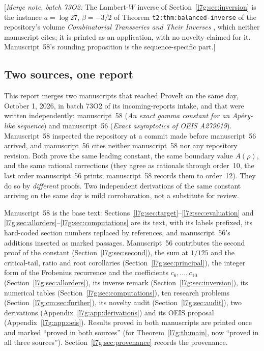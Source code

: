 \documentclass[11pt,letterpaper]{article}
\theoremstyle{remark}\newtheorem{remark}[theorem]{Remark}
\newcommand{\mergenote}[1]{\textup{[}\emph{Merge note, batch 73O2:} #1\textup{]}}
\newcounter{l7gtrsavedeq}
\begin{document}
\mergenote{The Lambert-$W$ inverse of Section~\ref{l7g:sec:inversion} is
the instance $a=\log27$, $\beta=-3/2$ of Theorem
\texttt{t2:thm:balanced-inverse} of the repository's volume
\emph{Combinatorial Transseries and Their Inverses} \cite{l7g:cti}, which
neither manuscript cites; it is printed as an application, with no novelty
claimed for it. Manuscript~58's rounding proposition is the
sequence-specific part.}

\subsection{Two sources, one report}\label{l7g:sec:sources}
This report merges two manuscripts that reached ProveIt on the same day,
October 1, 2026, in batch 73O2 of its incoming-reports intake, and that
were written independently: manuscript~58 (\emph{An exact gamma constant for
an Ap\'ery-like sequence}) and manuscript~56 (\emph{Exact asymptotics of
OEIS A279619}). Manuscript~58 inspected the repository at a commit made
before manuscript~56 arrived, and manuscript~56 cites neither manuscript~58
nor any repository revision. Both prove the same leading constant, the same
boundary value $A(\rho)$, and the same rational corrections (they agree as
rationals through order~10, the last order manuscript~56 prints; manuscript~58
records them to order~12). They do so by \emph{different} proofs. Two
independent derivations of the same constant arriving on the same day is
mild corroboration, not a substitute for review.

Manuscript~58 is the base text: Sections~\ref{l7g:sec:target}--\ref{l7g:sec:evaluation}
and \ref{l7g:sec:allorders}--\ref{l7g:sec:computations} are its text, with
its labels prefixed, its hard-coded section numbers replaced by
references, and manuscript~56's additions inserted as marked passages.
Manuscript~56 contributes the second proof of the constant
(Section~\ref{l7g:sec:second}), the sum at $1/125$ and the critical-tail,
ratio and root corollaries (Section~\ref{l7g:sec:principal}), the integer
form of the Frobenius recurrence and the coefficients $c_6,\dots,c_{10}$
(Section~\ref{l7g:sec:allorders}), its inverse remark
(Section~\ref{l7g:sec:inversion}), its numerical tables
(Section~\ref{l7g:sec:computations}), ten research problems
(Section~\ref{l7g:cm:sec:further}), its novelty audit
(Section~\ref{l7g:sec:audit}), two derivations
(Appendix~\ref{l7g:app:derivations}) and its OEIS proposal
(Appendix~\ref{l7g:app:oeis}). Results proved in both manuscripts are
printed once and marked ``proved in both sources'' (for
Theorem~\ref{l7g:th:main}, now ``proved in all three sources'').
Section~\ref{l7g:sec:provenance} records the provenance.
\end{document}
